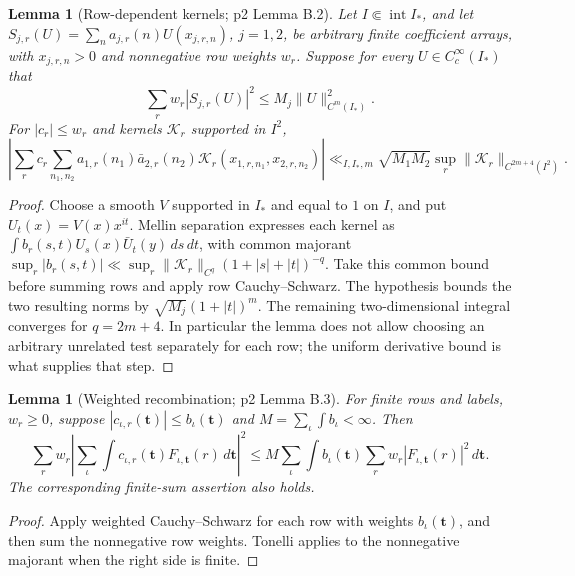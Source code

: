 \documentclass[11pt,a4paper]{article}
\numberwithin{equation}{section}
\newtheorem{lemma}[theorem]{Lemma}
\theoremstyle{definition}
\theoremstyle{remark}
\newcommand{\dd}{\,d}
\begin{document}
\begin{lemma}[Row-dependent kernels; p2 Lemma B.2]\label{lem:rowkernel}
Let $I\Subset\operatorname{int}I_*$, and let $S_{j,r}(U)=\sum_na_{j,r}(n)U(x_{j,r,n})$, $j=1,2$, be arbitrary finite coefficient arrays, with $x_{j,r,n}>0$ and nonnegative row weights $w_r$. Suppose for every $U\in C_c^\infty(I_*)$ that
\[
 \sum_rw_r|S_{j,r}(U)|^2\le M_j\|U\|_{C^m(I_*)}^2.
\]
For $|c_r|\le w_r$ and kernels $\mathcal K_r$ supported in $I^2$,
\[
 \left|\sum_rc_r\sum_{n_1,n_2}a_{1,r}(n_1)\bar a_{2,r}(n_2)
 \mathcal K_r(x_{1,r,n_1},x_{2,r,n_2})\right|
 \ll_{I,I_*,m}\sqrt{M_1M_2}\sup_r\|\mathcal K_r\|_{C^{2m+4}(I^2)}.
\]
\end{lemma}
\begin{proof}
Choose a smooth $V$ supported in $I_*$ and equal to $1$ on $I$, and put $U_t(x)=V(x)x^{it}$. Mellin separation expresses each kernel as $\int b_r(s,t)U_s(x)\bar U_t(y)\dd s\dd t$, with common majorant
$\sup_r|b_r(s,t)|\ll\sup_r\|\mathcal K_r\|_{C^q}(1+|s|+|t|)^{-q}$. Take this common bound before summing rows and apply row Cauchy--Schwarz. The hypothesis bounds the two resulting norms by $\sqrt{M_j}(1+|t|)^m$. The remaining two-dimensional integral converges for $q=2m+4$. In particular the lemma does not allow choosing an arbitrary unrelated test separately for each row; the uniform derivative bound is what supplies that step.
\end{proof}

\begin{lemma}[Weighted recombination; p2 Lemma B.3]\label{lem:recombine}
For finite rows and labels, $w_r\ge0$, suppose $|c_{\iota,r}(\boldsymbol t)|\le b_\iota(\boldsymbol t)$ and $M=\sum_\iota\int b_\iota<\infty$. Then
\[
 \sum_rw_r\left|\sum_\iota\int c_{\iota,r}(\boldsymbol t)F_{\iota,\boldsymbol t}(r)\dd\boldsymbol t\right|^2
 \le M\sum_\iota\int b_\iota(\boldsymbol t)\sum_rw_r|F_{\iota,\boldsymbol t}(r)|^2\dd\boldsymbol t.
\]
The corresponding finite-sum assertion also holds.
\end{lemma}
\begin{proof}
Apply weighted Cauchy--Schwarz for each row with weights $b_\iota(\boldsymbol t)$, and then sum the nonnegative row weights. Tonelli applies to the nonnegative majorant when the right side is finite.
\end{proof}
\end{document}
